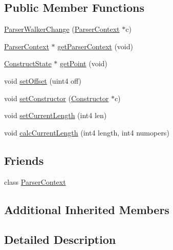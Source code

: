 \subsection*{Public Member Functions}
\begin{DoxyCompactItemize}
\item 
\mbox{\hyperlink{class_parser_walker_change_a73f991f2ee657a0777ae0f4c6f9d4d29}{Parser\+Walker\+Change}} (\mbox{\hyperlink{class_parser_context}{Parser\+Context}} $\ast$c)
\item 
\mbox{\hyperlink{class_parser_context}{Parser\+Context}} $\ast$ \mbox{\hyperlink{class_parser_walker_change_afcfcb1813b7e0c61acf676144a524b33}{get\+Parser\+Context}} (void)
\item 
\mbox{\hyperlink{struct_construct_state}{Construct\+State}} $\ast$ \mbox{\hyperlink{class_parser_walker_change_aae58d318a27711b1188d825efe36a63d}{get\+Point}} (void)
\item 
void \mbox{\hyperlink{class_parser_walker_change_a95880c16791ab4b8a3f3556826063c0c}{set\+Offset}} (uint4 off)
\item 
void \mbox{\hyperlink{class_parser_walker_change_a4526bad75395a124aebb7cf7c2b09f1b}{set\+Constructor}} (\mbox{\hyperlink{class_constructor}{Constructor}} $\ast$c)
\item 
void \mbox{\hyperlink{class_parser_walker_change_ae7d8dad0cb3843f51e7d169f1aae15ea}{set\+Current\+Length}} (int4 len)
\item 
void \mbox{\hyperlink{class_parser_walker_change_a17bd52cea759f8d55a1c6e1514da9dc8}{calc\+Current\+Length}} (int4 length, int4 numopers)
\end{DoxyCompactItemize}
\subsection*{Friends}
\begin{DoxyCompactItemize}
\item 
class \mbox{\hyperlink{class_parser_walker_change_a8f3a897ae30e39693692d15b6706db59}{Parser\+Context}}
\end{DoxyCompactItemize}
\subsection*{Additional Inherited Members}


\subsection{Detailed Description}


